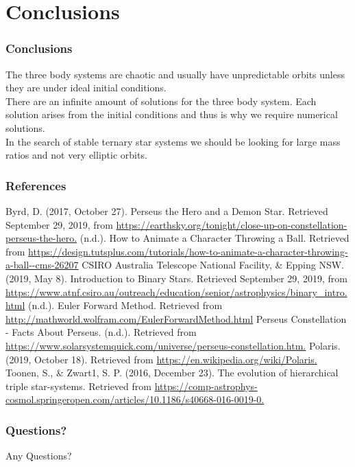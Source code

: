\documentclass{beamer}
\begin{document}
\section{Conclusions}
\begin{frame}
\frametitle{Conclusions}
The three body systems are chaotic and usually have unpredictable orbits unless they are under ideal initial conditions. \\
\vspace{10pt}
There are an infinite amount of solutions for the three body system. Each solution arises from the initial conditions and thus is why we require numerical solutions. \\
\vspace{10pt}
In the search of stable ternary star systems we should be looking for large mass ratios and not very elliptic orbits.
\end{frame}
\begin{frame}
\frametitle{References}
\footnotesize{
\begin{thebibliography}{99}
\tiny{Byrd, D. (2017, October 27). Perseus the Hero and a Demon Star. Retrieved September 29, 2019, from \url{https://earthsky.org/tonight/close-up-on-constellation-perseus-the-hero.}}
\tiny{(n.d.). How to Animate a Character Throwing a Ball. Retrieved from \url{https://design.tutsplus.com/tutorials/how-to-animate-a-character-throwing-a-ball--cms-26207}}
\tiny{CSIRO Australia Telescope National Facility, \& Epping NSW. (2019, May 8). Introduction to Binary Stars. Retrieved September 29, 2019, from \url{https://www.atnf.csiro.au/outreach/education/senior/astrophysics/binary_intro.html}}
\tiny{(n.d.). Euler Forward Method. Retrieved from \url{http://mathworld.wolfram.com/EulerForwardMethod.html}}
\tiny{Perseus Constellation - Facts About Perseus. (n.d.). Retrieved from \url{https://www.solarsystemquick.com/universe/perseus-constellation.htm.}}
\tiny{Polaris. (2019, October 18). Retrieved from \url{https://en.wikipedia.org/wiki/Polaris.}}
\tiny{Toonen, S., \& Zwart1, S. P. (2016, December 23). The evolution of hierarchical triple star-systems. Retrieved from \url{https://comp-astrophys-cosmol.springeropen.com/articles/10.1186/s40668-016-0019-0.}}
\end{thebibliography}
}
\end{frame}
\begin{frame}
\frametitle{Questions?}
Any Questions?
\end{frame}
\end{document}
